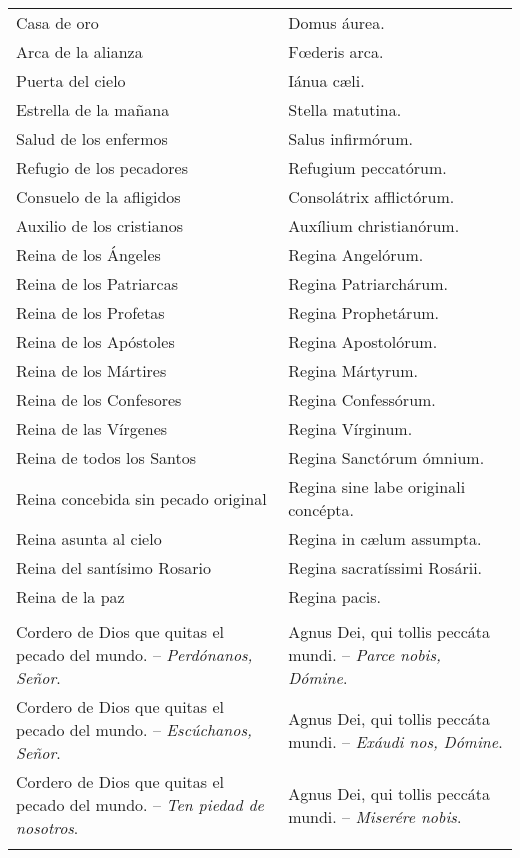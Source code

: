 \documentclass[./rosary.tex]{subfiles}
\begin{document}
\begin{longtable} { p{} p{} }
    Casa de oro & Domus áurea.\\
    Arca de la alianza & Fœderis arca.\\
    Puerta del cielo & Iánua cæli.\\
    Estrella de la mañana & Stella matutina.\\
    Salud de los enfermos & Salus infirmórum.\\
    Refugio de los pecadores & Refugium peccatórum.\\
    Consuelo de la afligidos & Consolátrix af­flic­tórum.\\
    Auxilio de los cristianos & Auxílium chris­tia­nórum.\\
    Reina de los Ángeles & Regina Angelórum.\\
    Reina de los Patriarcas & Regina Pa­triar­chárum.\\
    Reina de los Profetas & Regina Pro­phe­tárum.\\
    Reina de los Apóstoles & Regina Apos­to­lórum.\\
    Reina de los Mártires & Regina Mártyrum.\\
    Reina de los Confesores & Regina Con­fe­ssórum.\\
    Reina de las Vírgenes & Regina Vírginum.\\
    Reina de todos los Santos & Regina Sanctórum ómnium.\\
    Reina concebida sin pecado original & Regina sine labe originali concépta.\\
    Reina asunta al cielo & Regina in cælum assumpta.\\
    Reina del santísimo Rosario & Regina sa­cra­tíssimi Rosárii.\\
    Reina de la paz & Regina pacis.\\\\
    Cordero de Dios que quitas el pecado del mundo. -- \emph{Perdónanos, Señor}.
        &
    Agnus Dei, qui tollis peccáta mundi. -- \emph{Parce nobis, Dómine}.\\
    Cordero de Dios que quitas el pecado del mundo. -- \emph{Escúchanos, Señor}.
        &
    Agnus Dei, qui tollis peccáta mundi. -- \emph{Exáudi nos, Dómine}.\\
    Cordero de Dios que quitas el pecado del mundo. -- \emph{Ten piedad de nosotros}.
        &
    Agnus Dei, qui tollis peccáta mundi. -- \emph{Miserére nobis}.\\\\


\end{longtable}
\end{document}
